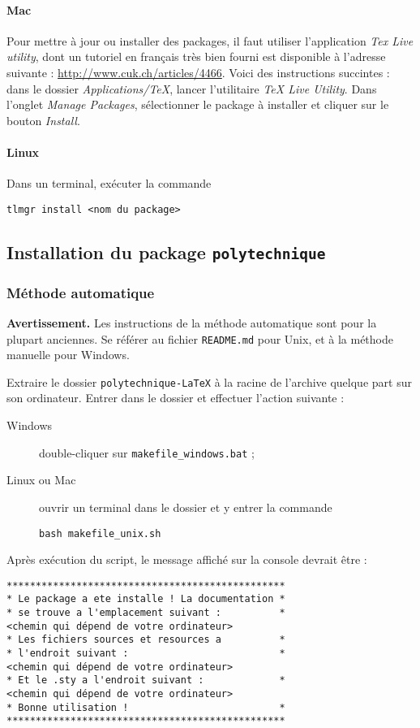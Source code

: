 \documentclass[a4paper,12pt,twoside]{article}
\begin{document}
\paragraph{Mac} Pour mettre à jour ou installer des packages, il faut utiliser l'application \emph{Tex Live utility}, dont un tutoriel en français très bien fourni est disponible à l'adresse suivante : \url{http://www.cuk.ch/articles/4466}. Voici des instructions succintes : dans le dossier \emph{Applications/TeX}, lancer l'utilitaire \emph{TeX Live Utility}. Dans l'onglet \emph{Manage Packages}, sélectionner le package à installer et cliquer sur le bouton \emph{Install}.

\paragraph{Linux} Dans un terminal, exécuter la commande 
\begin{verbatim}
tlmgr install <nom du package>
\end{verbatim}


\subsection{Installation du package \texttt{polytechnique}}

\subsubsection{Méthode automatique}

\textbf{Avertissement.} Les instructions de la méthode automatique sont pour la plupart anciennes. Se référer au fichier \texttt{README.md} pour Unix, et à la méthode manuelle pour Windows.

Extraire le dossier \texttt{polytechnique-LaTeX} à la racine de l'archive quelque part sur son ordinateur. Entrer dans le dossier et effectuer l'action suivante :
\begin{description}
\item[Windows] double-cliquer sur \texttt{makefile\_windows.bat} ;
\item[Linux ou Mac] ouvrir un terminal dans le dossier et y entrer la commande
\begin{verbatim}
bash makefile_unix.sh
\end{verbatim}
\end{description}
Après exécution du script, le message affiché sur la console devrait être :
\begin{verbatim}
************************************************
* Le package a ete installe ! La documentation *
* se trouve a l'emplacement suivant :          *
<chemin qui dépend de votre ordinateur>
* Les fichiers sources et resources a          *
* l'endroit suivant :                          *
<chemin qui dépend de votre ordinateur>
* Et le .sty a l'endroit suivant :             *
<chemin qui dépend de votre ordinateur>
* Bonne utilisation !                          *
************************************************
\end{verbatim}
\end{document}
